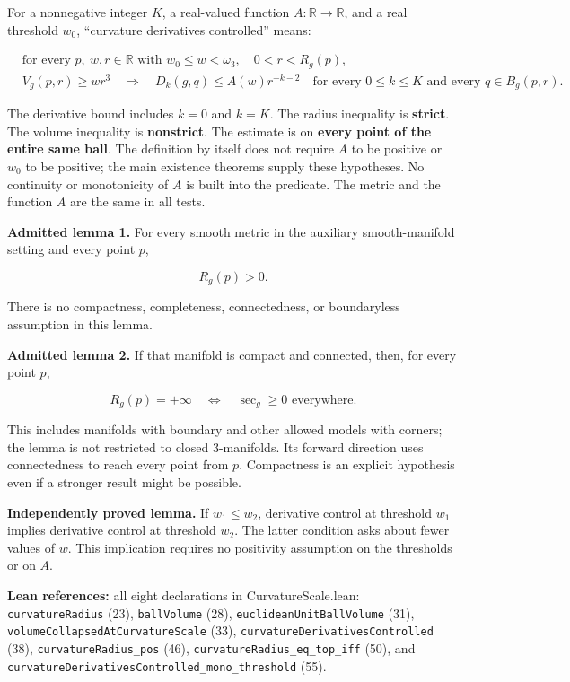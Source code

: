 \documentclass[
  letterpaper,
  11pt]{article}
\begin{document}
For a nonnegative integer \(K\), a real-valued function
\(A:\mathbb R\to\mathbb R\), and a real threshold \(w_0\), ``curvature
derivatives controlled'' means:

\[
\begin{split}
&\text{for every }p,\ w,r\in\mathbb R\text{ with }w_0\leq w<\omega_3,\quad 0<r<R_g(p),\\
&V_g(p,r)\geq wr^3
\quad\Longrightarrow\quad
 D_k(g,q)\leq A(w)r^{-k-2}
 \quad\text{for every }0\leq k\leq K\text{ and every }q\in B_g(p,r).
\end{split}
\]

The derivative bound includes \(k=0\) and \(k=K\). The radius inequality
is \textbf{strict}. The volume inequality is \textbf{nonstrict}. The
estimate is on \textbf{every point of the entire same ball}. The
definition by itself does not require \(A\) to be positive or \(w_0\) to
be positive; the main existence theorems supply these hypotheses. No
continuity or monotonicity of \(A\) is built into the predicate. The
metric and the function \(A\) are the same in all tests.

\textbf{Admitted lemma 1.} For every smooth metric in the auxiliary
smooth-manifold setting and every point \(p\),

\[
 R_g(p)>0.
\]

There is no compactness, completeness, connectedness, or boundaryless
assumption in this lemma.

\textbf{Admitted lemma 2.} If that manifold is compact and connected,
then, for every point \(p\),

\[
 R_g(p)=+\infty\quad\Longleftrightarrow\quad \sec_g\geq0\text{ everywhere}.
\]

This includes manifolds with boundary and other allowed models with
corners; the lemma is not restricted to closed 3-manifolds. Its forward
direction uses connectedness to reach every point from \(p\).
Compactness is an explicit hypothesis even if a stronger result might be
possible.

\textbf{Independently proved lemma.} If \(w_1\leq w_2\), derivative
control at threshold \(w_1\) implies derivative control at threshold
\(w_2\). The latter condition asks about fewer values of \(w\). This
implication requires no positivity assumption on the thresholds or on
\(A\).

\textbf{Lean references:} all eight declarations in CurvatureScale.lean:
{\small\texttt{curvature\allowbreak{}Radius}} (23),
{\small\texttt{ball\allowbreak{}Volume}} (28),
{\small\texttt{euclidean\allowbreak{}Unit\allowbreak{}Ball\allowbreak{}Volume}}
(31),
{\small\texttt{volume\allowbreak{}Collapsed\allowbreak{}At\allowbreak{}Curvature\allowbreak{}Scale}}
(33),
{\small\texttt{curvature\allowbreak{}Derivatives\allowbreak{}Controlled}}
(38), {\small\texttt{curvature\allowbreak{}Radius\_\allowbreak{}pos}}
(46),
{\small\texttt{curvature\allowbreak{}Radius\_\allowbreak{}eq\_\allowbreak{}top\_\allowbreak{}iff}}
(50), and
{\small\texttt{curvature\allowbreak{}Derivatives\allowbreak{}Controlled\_\allowbreak{}mono\_\allowbreak{}threshold}}
(55).
\end{document}
